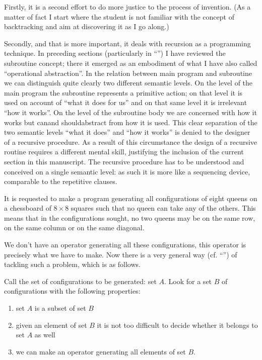 Firstly, it is a second effort to do more justice to the process of invention. (As a matter of fact I start where the student is not familiar with the concept of backtracking and aim at discovering it as I go along.)

Secondly, and that is more important, it deals with recursion as a programming technique. In preceding sections (particularly in ``'') I have reviewed the subroutine concept; there it emerged as an embodiment of what I have also called ``operational abstraction''. In the relation between main program and subroutine we can distinguish quite clearly two different semantic levels. On the level of the main program the subroutine represents a primitive action; on that level it is used on account of ``what it does for us'' and on that same level it is irrelevant ``how it works''. On the level of the subroutine body we are concerned with how it works but can\textemdash{}and should\textemdash{}abstract from how it is used. This clear separation of the two semantic levels ``what it does'' and ``how it works'' is denied to the designer of a recursive procedure. As a result of this circumstance the design of a recursive routine requires a different mental skill, justifying the inclusion of the current section in this manuscript. The recursive procedure has to be understood and conceived on a single semantic level: as such it is more like a sequencing device, comparable to the repetitive clauses.

It is requested to make a program generating all configurations of eight queens on a chessboard of $8\times 8$ squares such that no queen can take any of the others. This means that in the configurations sought, no two queens may be on the same row, on the same column or on the same diagonal.

We don't have an operator generating all these configurations, this operator is precisely what we have to make. Now there is a very general way (cf. ``'') of tackling such a problem, which is as follows.

Call the set of configurations to be generated: set $A$. Look for a set $B$ of configurations with the following properties:

\begin{enumerate}[wide, nosep, label=(\arabic*)]
	\item \label{en:first-item-eight-queen}
	set $A$ is a subset of set $B$
	
	\item \label{en:second-item-eight-queen}
	given an element of set $B$ it is not too difficult to decide whether it belongs to set $A$ as well
	
	\item \label{en:third-item-eight-queen}
	we can make an operator generating all elements of set $B$. 
\end{enumerate}

